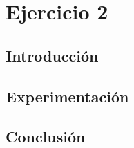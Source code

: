 \section{Ejercicio 2}

\subsection{Introducción}

\subsection{Experimentación}

\subsection{Conclusión}

\newpage
